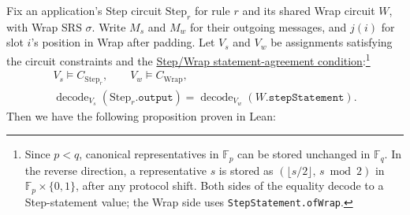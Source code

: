 \documentclass[11pt,a4paper]{article}
\newcommand{\inlinecode}[1]{\mbox{\texttt{#1}}}
\theoremstyle{definition}
\theoremstyle{insetstatement}
\begin{document}
Fix an application's Step circuit $\mathrm{Step}_r$ for rule $r$ and its
shared Wrap circuit $W$, with Wrap SRS $\sigma$.
Write \href{https://github.com/l-adic/snarky/blob/main/formal/pickles/Pickles/Statement.lean\#L123-L131}{$M_s$}
and \href{https://github.com/l-adic/snarky/blob/main/formal/pickles/Pickles/Statement.lean\#L135-L139}{$M_w$}
for their outgoing messages, and $j(i)$ for slot
$i$'s position in Wrap after padding.
Let $V_s$ and $V_w$ be assignments satisfying the circuit constraints
and the \href{https://github.com/l-adic/snarky/blob/main/formal/pickles/Pickles/Soundness/StepWrap.lean\#L516}{Step/Wrap statement-agreement condition}:\footnote{Since
  $p<q$, canonical representatives in $\mathbb{F}_p$ can be stored unchanged
  in $\mathbb{F}_q$. In the reverse direction, a representative $s$ is stored
  as $(\lfloor s/2\rfloor,\,s\bmod 2)$ in $\mathbb{F}_p\times\{0,1\}$,
  after any protocol shift. Both sides of the equality decode to a
  Step-statement value; the Wrap side uses
  \inlinecode{StepStatement.ofWrap}.}
\[
  \begin{gathered}
    V_s\models C_{\mathrm{Step}_r},
    \qquad V_w\models C_{\mathrm{Wrap}},\\
    \operatorname{decode}_{V_s}(\mathrm{Step}_r.\mathtt{output})
      =\operatorname{decode}_{V_w}(W.\mathtt{stepStatement}).
  \end{gathered}
\]
Then we have the following proposition proven in Lean:
\end{document}
